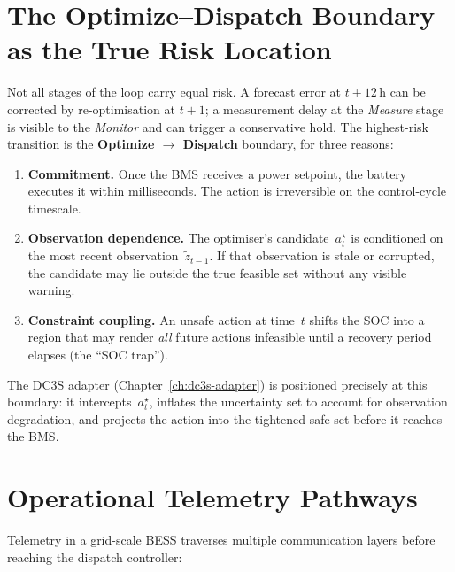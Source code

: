 \section{The Optimize--Dispatch Boundary as the True Risk Location}

Not all stages of the loop carry equal risk.  A forecast error at
$t + 12$\,h can be corrected by re-optimisation at $t + 1$; a measurement
delay at the \emph{Measure} stage is visible to the \emph{Monitor} and can
trigger a conservative hold.  The highest-risk transition is the
\textbf{Optimize $\to$ Dispatch} boundary, for three reasons:

\begin{enumerate}
  \item \textbf{Commitment.}  Once the BMS receives a power setpoint, the
    battery executes it within milliseconds.  The action is irreversible on the
    control-cycle timescale.
  \item \textbf{Observation dependence.}  The optimiser's candidate~$a_t^\star$
    is conditioned on the most recent observation~$\tilde{z}_{t-1}$.  If that
    observation is stale or corrupted, the candidate may lie outside the true
    feasible set without any visible warning.
  \item \textbf{Constraint coupling.}  An unsafe action at time~$t$ shifts the
    SOC into a region that may render \emph{all} future actions infeasible
    until a recovery period elapses (the ``SOC trap'').
\end{enumerate}

The DC3S adapter (Chapter~\ref{ch:dc3s-adapter}) is positioned precisely at
this boundary: it intercepts~$a_t^\star$, inflates the uncertainty set to
account for observation degradation, and projects the action into the
tightened safe set before it reaches the BMS.

\section{Operational Telemetry Pathways}

Telemetry in a grid-scale BESS traverses multiple communication layers before
reaching the dispatch controller:

